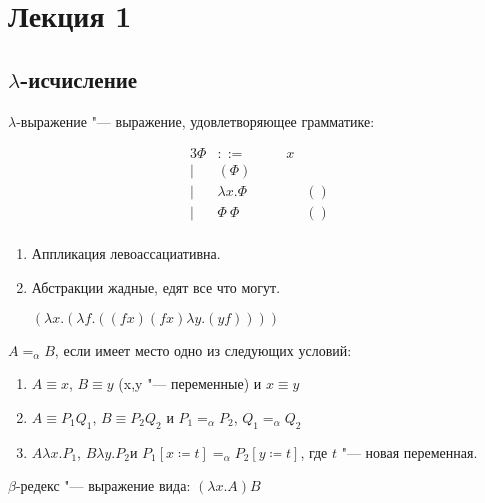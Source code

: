 \section{Лекция 1}

\subsection{$\lambda$-исчисление}

\begin{definition}
	$\lambda$-выражение "--- выражение, удовлетворяющее грамматике:
	\vspace{1mm}
	\begin{bnf}\begin{alignat*}{3}
		\Phi &::=& x \\
		| & \left(\Phi\right) \\
		| & \lambda{}x.\Phi \qquad && () \\
		| & \Phi \ \Phi         && () \\
	\end{alignat*}\end{bnf}
	\begin{enumerate}
		\item Аппликация левоассациативна.
		\item Абстракции жадные, едят все что могут.
		\vspace{1mm}
		\begin{example}
			$(\lambda{}x.(\lambda{}f.((f x) (f x) \lambda{}y.(y f))))$
		\end{example}
	\end{enumerate}
\end{definition}

\begin{definition}
	$A=_{\alpha}B$, если имеет место одно из следующих условий:
	\begin{enumerate}
		\item $A\equiv{}x$, $B\equiv{}y$ (x,y "--- переменные) и $x\equiv{}y$
		\item $A\equiv{}P_{1}Q_{1}$, $B\equiv{}P_{2}Q_{2}$ и $P_{1}=_{\alpha}P_{2}$, $Q_{1}=_{\alpha}Q_{2}$
		\item $A\lambda{}x.P_{1}$, $B\lambda{}y.P_{2}$и $P_{1} [x\coloneqq{}t] =_{\alpha}P_2 [y\coloneqq{}t]$, где $t$ "--- новая переменная.
	\end{enumerate} 
\end{definition}

\begin{definition}
	$\beta$-редекс "--- выражение вида: $\left(\lambda{}x.A\right)B$
\end{definition}

